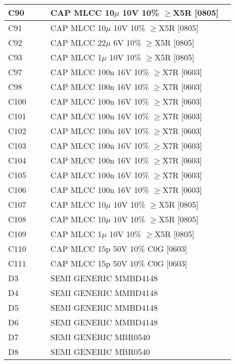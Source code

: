 \begin{longtable}{|l|l|l|l|l|}
\hline
C90 &  &  & CAP MLCC 10\ensuremath{\mu} 10V 10\% \ensuremath{\geq}X5R [0805] &  \\
\hline
C91 &  &  & CAP MLCC 10\ensuremath{\mu} 10V 10\% \ensuremath{\geq}X5R [0805] &  \\
\hline
C92 &  &  & CAP MLCC 22\ensuremath{\mu} 6V 10\% \ensuremath{\geq}X5R [0805] &  \\
\hline
C93 &  &  & CAP MLCC 1\ensuremath{\mu} 10V 10\% \ensuremath{\geq}X5R [0805] &  \\
\hline
C97 &  &  & CAP MLCC 100n 16V 10\% \ensuremath{\geq}X7R [0603] &  \\
\hline
C98 &  &  & CAP MLCC 100n 16V 10\% \ensuremath{\geq}X7R [0603] &  \\
\hline
C100 &  &  & CAP MLCC 100n 16V 10\% \ensuremath{\geq}X7R [0603] &  \\
\hline
C101 &  &  & CAP MLCC 100n 16V 10\% \ensuremath{\geq}X7R [0603] &  \\
\hline
C102 &  &  & CAP MLCC 100n 16V 10\% \ensuremath{\geq}X7R [0603] &  \\
\hline
C103 &  &  & CAP MLCC 100n 16V 10\% \ensuremath{\geq}X7R [0603] &  \\
\hline
C104 &  &  & CAP MLCC 100n 16V 10\% \ensuremath{\geq}X7R [0603] &  \\
\hline
C105 &  &  & CAP MLCC 100n 16V 10\% \ensuremath{\geq}X7R [0603] &  \\
\hline
C106 &  &  & CAP MLCC 100n 16V 10\% \ensuremath{\geq}X7R [0603] &  \\
\hline
C107 &  &  & CAP MLCC 10\ensuremath{\mu} 10V 10\% \ensuremath{\geq}X5R [0805] &  \\
\hline
C108 &  &  & CAP MLCC 10\ensuremath{\mu} 10V 10\% \ensuremath{\geq}X5R [0805] &  \\
\hline
C109 &  &  & CAP MLCC 1\ensuremath{\mu} 10V 10\% \ensuremath{\geq}X5R [0805] &  \\
\hline
C110 &  &  & CAP MLCC 15p 50V 10\% C0G [0603] &  \\
\hline
C111 &  &  & CAP MLCC 15p 50V 10\% C0G [0603] &  \\
\hline
D3 &  &  & SEMI GENERIC MMBD4148 &  \\
\hline
D4 &  &  & SEMI GENERIC MMBD4148 &  \\
\hline
D5 &  &  & SEMI GENERIC MMBD4148 &  \\
\hline
D6 &  &  & SEMI GENERIC MMBD4148 &  \\
\hline
D7 &  &  & SEMI GENERIC MBR0540 &  \\
\hline
D8 &  &  & SEMI GENERIC MBR0540 &  \\

\end{longtable}
